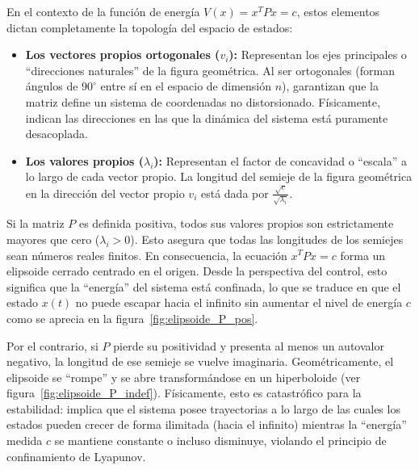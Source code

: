 En el contexto de la función de energía $V(x) = x^T P x = c$, estos elementos dictan completamente la topología del espacio de estados:
\begin{itemize}
    \item \textbf{Los vectores propios ortogonales ($v_i$):} Representan los ejes principales o ``direcciones naturales'' de la figura geométrica. Al ser ortogonales (forman ángulos de $90^\circ$ entre sí en el espacio de dimensión $n$), garantizan que la matriz define un sistema de coordenadas no distorsionado. Físicamente, indican las direcciones en las que la dinámica del sistema está puramente desacoplada.
    \item \textbf{Los valores propios ($\lambda_i$):} Representan el factor de concavidad o ``escala'' a lo largo de cada vector propio. La longitud del semieje de la figura geométrica en la dirección del vector propio $v_i$ está dada por $\frac{\sqrt{c}}{\sqrt{\lambda_i}}$. 
\end{itemize}

Si la matriz $P$ es definida positiva, todos sus valores propios son estrictamente mayores que cero ($\lambda_i > 0$). Esto asegura que todas las longitudes de los semiejes sean números reales finitos. En consecuencia, la ecuación $x^T P x = c$ forma un elipsoide cerrado centrado en el origen. Desde la perspectiva del control, esto significa que la ``energía'' del sistema está confinada, lo que se traduce en que el estado $x(t)$ no puede escapar hacia el infinito sin aumentar el nivel de energía $c$ como se aprecia en la figura~\ref{fig:elipsoide_P_pos}.

Por el contrario, si $P$ pierde su positividad y presenta al menos un autovalor negativo, la longitud de ese semieje se vuelve imaginaria. Geométricamente, el elipsoide se ``rompe'' y se abre transformándose en un hiperboloide (ver figura~\ref{fig:elipsoide_P_indef}). Físicamente, esto es catastrófico para la estabilidad: implica que el sistema posee trayectorias a lo largo de las cuales los estados pueden crecer de forma ilimitada (hacia el infinito) mientras la ``energía'' medida $c$ se mantiene constante o incluso disminuye, violando el principio de confinamiento de Lyapunov.

